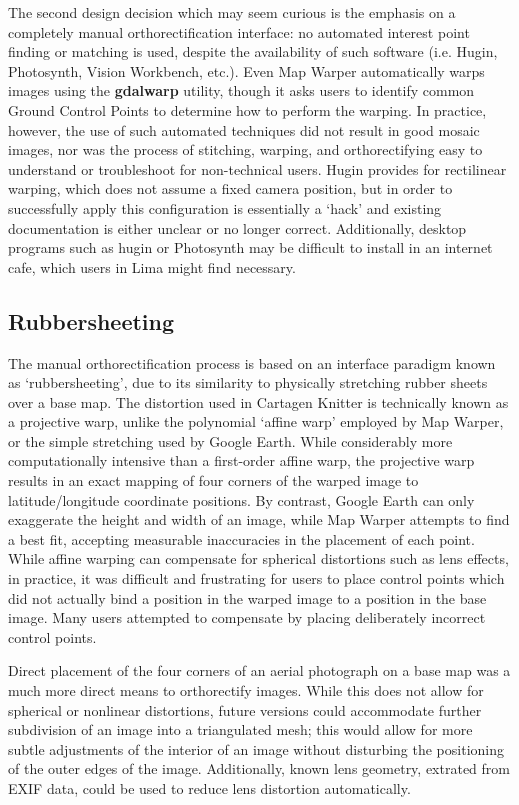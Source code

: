 \documentclass[11pt,oneside,notitlepage]{report}
\begin{document}
The second design decision which may seem curious is the emphasis on a completely manual orthorectification interface: no automated interest point finding or matching is used, despite the availability of such software (i.e. Hugin, Photosynth, Vision Workbench, etc.). Even Map Warper automatically warps images using the \textbf{gdalwarp} utility, though it asks users to identify common Ground Control Points to determine how to perform the warping. In practice, however, the use of such automated techniques did not result in good mosaic images, nor was the process of stitching, warping, and orthorectifying easy to understand or troubleshoot for non-technical users. Hugin provides for rectilinear warping, which does not assume a fixed camera position, but in order to successfully apply this configuration is essentially a `hack' and existing documentation is either unclear or no longer correct. Additionally, desktop programs such as hugin or Photosynth may be difficult to install in an internet cafe, which users in Lima might find necessary.

\subsection{Rubbersheeting}
\label{subsec:rubbersheeting}

The manual orthorectification process is based on an interface paradigm known as `rubbersheeting', due to its similarity to physically stretching rubber sheets over a base map. The distortion used in Cartagen Knitter is technically known as a projective warp, unlike the polynomial `affine warp' employed by Map Warper, or the simple stretching used by Google Earth. While considerably more computationally intensive than a first-order affine warp, the projective warp results in an exact mapping of four corners of the warped image to latitude/longitude coordinate positions. By contrast, Google Earth can only exaggerate the height and width of an image, while Map Warper attempts to find a best fit, accepting measurable inaccuracies in the placement of each point. While affine warping can compensate for spherical distortions such as lens effects, in practice, it was difficult and frustrating for users to place control points which did not actually bind a position in the warped image to a position in the base image. Many users attempted to compensate by placing deliberately incorrect control points. \cite{bentley2010warping} 

Direct placement of the four corners of an aerial photograph on a base map was a much more direct means to orthorectify images. While this does not allow for spherical or nonlinear distortions, future versions could accommodate further subdivision of an image into a triangulated mesh; this would allow for more subtle adjustments of the interior of an image without disturbing the positioning of the outer edges of the image. Additionally, known lens geometry, extrated from \ac{EXIF} data, could be used to reduce lens distortion automatically.  
\end{document}
